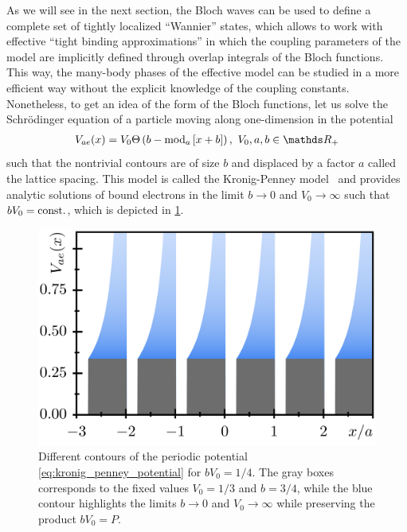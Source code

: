 As we will see in the next section, the Bloch waves can be used to define a complete set of tightly localized ``Wannier'' states, which allows to work with effective ``tight binding approximations'' in which the coupling parameters of the model are implicitly defined through overlap integrals of the Bloch functions.
This way, the many-body phases of the effective model can be studied in a more efficient way without the explicit knowledge of the coupling constants.
Nonetheless, to get an idea of the form of the Bloch functions, let us solve the Schrödinger equation of a particle moving along one-dimension in the potential
\begin{align}
    V_{ae}(x) = V_0 \Theta\brlr{b-{\rm mod}_{a}\commutator{x+b}},\ V_0,a,b\in\mathds R_+
    \label{eq:kronig_penney_potential}
\end{align}
such that the nontrivial contours are of size $b$ and displaced by a factor $a$ called the lattice spacing.
This model is called the Kronig-Penney model~\cite{KronigPenney1931} and provides analytic solutions of bound electrons in the limit $b\rightarrow0$ and $V_0\rightarrow\infty$ such that $bV_0={\rm const.}$, which is depicted in \cref{fig:kronig_penney_potential}.
\begin{figure}
    \centering
    \includegraphics{figures/kronig_penney_potential.png}
    \caption{Different contours of the periodic potential \cref{eq:kronig_penney_potential} for $bV_0=1/4$. The gray boxes corresponds to the fixed values $V_0=1/3$ and $b=3/4$, while the blue contour highlights the limits $b\rightarrow0$ and $V_0\rightarrow\infty$ while preserving the product $bV_0=P$.}
    \label{fig:kronig_penney_potential}
\end{figure}

